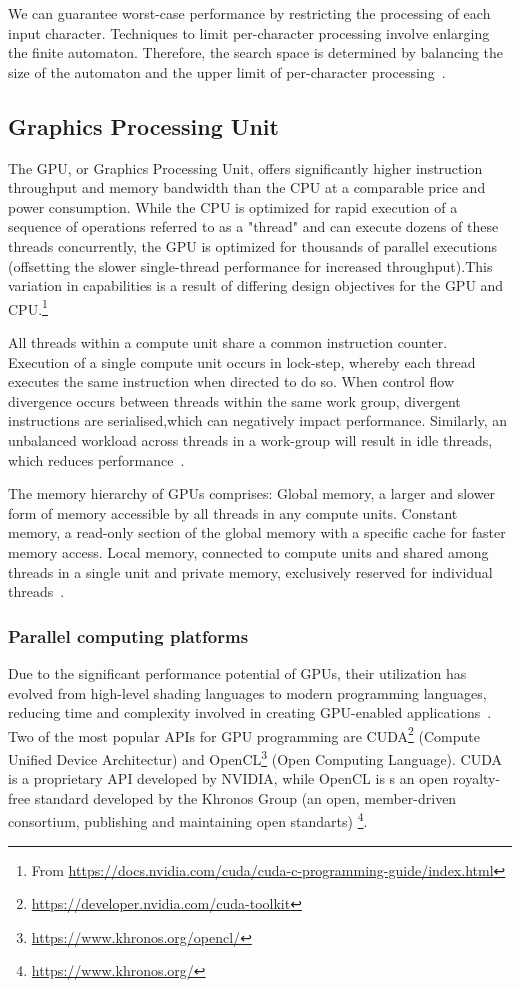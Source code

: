 \documentclass[10pt,onecolumn,twoside,english,a4paper]{article}
\begin{document}
We can guarantee worst-case performance by restricting the processing of each input character. Techniques to limit per-character processing involve enlarging the finite automaton. Therefore, the search space is determined by balancing the size of the automaton and the upper limit of per-character processing~\cite{Nourian:DemystifyingFSA}.

\subsection{Graphics Processing Unit} \label{GPU}
The GPU, or Graphics Processing Unit, offers significantly higher instruction throughput and memory bandwidth than the CPU at a comparable price and power consumption.
While the CPU is optimized for rapid execution of a sequence of operations referred to as a "thread" and can execute dozens of these threads concurrently, the GPU is optimized for thousands of parallel executions (offsetting the slower single-thread performance for increased throughput).This variation in capabilities is a result of differing design objectives for the GPU and CPU.\footnote{From \url{https://docs.nvidia.com/cuda/cuda-c-programming-guide/index.html}}

All threads within a compute unit share a common instruction counter. Execution of a single compute unit occurs in lock-step, whereby each thread executes the same instruction when directed to do so. When control flow divergence occurs between threads within the same work group, divergent instructions are serialised,which can negatively impact performance.
Similarly, an unbalanced workload across threads in a work-group will result in idle threads, which reduces performance~\cite{yaneva2022gpuaccelerationFSA}.

The memory hierarchy of GPUs comprises: Global memory, a larger and slower form of memory accessible by all threads in any compute units. Constant memory, a read-only section of the global memory with a specific cache for faster memory access. Local memory, connected to compute units and shared among threads in a single unit and private memory, exclusively reserved for individual threads~\cite{yaneva2022gpuaccelerationFSA}.

\subsubsection{Parallel computing platforms} \label{Parallel computing platforms}
Due to the significant performance potential of GPUs, their  utilization has evolved from high-level shading languages to modern programming languages, reducing time and complexity involved in creating GPU-enabled applications~\cite{Asaduzzaman:Impact_CUDA_OpenCL}.
Two of the most popular APIs for GPU programming are CUDA\footnote{\url{https://developer.nvidia.com/cuda-toolkit}} (Compute Unified Device Architectur) and OpenCL\footnote{\url{https://www.khronos.org/opencl/}} (Open Computing Language). CUDA is a proprietary API developed by NVIDIA, while OpenCL is s an open royalty-free standard developed by the Khronos Group (an open, member-driven consortium, publishing and maintaining open standarts) \footnote{\url{https://www.khronos.org/}}.
\end{document}
